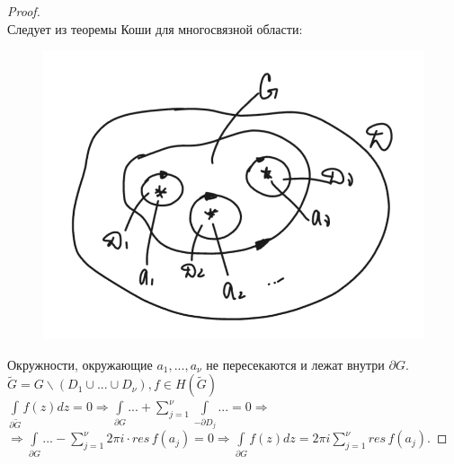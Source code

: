 \begin{proof}
    \ \\
    Следует из теоремы Коши для многосвязной области:\\
    \begin{figure}[h]
        \centering
        \includegraphics[width=1\linewidth]{answers/img/ans15.png}
    \end{figure}
    Окружности, окружающие $a_1, ..., a_\nu$ не пересекаются и лежат внутри $\partial G$.\\
    $\tilde{G}=G\backslash (D_1 \cup ...\cup D_\nu), f\in H(\tilde{G})$\\
    $\int\limits_{\partial \tilde{G}} f(z)dz = 0 \Rightarrow \int\limits_{\partial G}...+\sum_{j=1}^\nu \int\limits_{-\partial D_j}...=0 \Rightarrow$\\
    $\Rightarrow \int\limits_{\partial G}...-\sum_{j=1}^\nu 2\pi i \cdot res\, f(a_j)=0 \Rightarrow \int\limits_{\partial G}f(z)dz=2\pi i \sum_{j=1}^\nu res\,f(a_j)$.
\end{proof}

